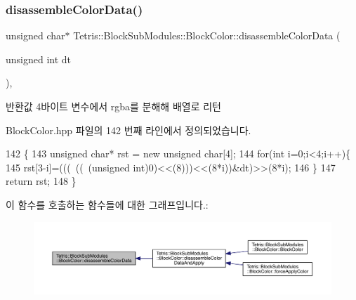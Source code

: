 \subsubsection{\texorpdfstring{disassemble\+Color\+Data()}{disassembleColorData()}}
{\footnotesize\ttfamily unsigned char$\ast$ Tetris\+::\+Block\+Sub\+Modules\+::\+Block\+Color\+::disassemble\+Color\+Data (\begin{DoxyParamCaption}\item[{unsigned int}]{dt }\end{DoxyParamCaption})\hspace{0.3cm}{\ttfamily [inline]}, {\ttfamily [private]}}

\begin{DoxyReturn}{반환값}
4바이트 변수에서 rgba를 분해해 배열로 리턴 
\end{DoxyReturn}


Block\+Color.\+hpp 파일의 142 번째 라인에서 정의되었습니다.


\begin{DoxyCode}
142                                                                     \{
143                     \textcolor{keywordtype}{unsigned} \textcolor{keywordtype}{char}* rst = \textcolor{keyword}{new} \textcolor{keywordtype}{unsigned} \textcolor{keywordtype}{char}[4];
144                     \textcolor{keywordflow}{for}(\textcolor{keywordtype}{int} i=0;i<4;i++)\{
145                         rst[3-i]=(((~((~(\textcolor{keywordtype}{unsigned} int)0)<<(8)))<<(8*i))&dt)>>(8*i);
146                     \}
147                     \textcolor{keywordflow}{return} rst;
148                 \}
\end{DoxyCode}
이 함수를 호출하는 함수들에 대한 그래프입니다.\+:
\nopagebreak
\begin{figure}[H]
\begin{center}
\leavevmode
\includegraphics[width=350pt]{de/d44/class_tetris_1_1_block_sub_modules_1_1_block_color_a216ddc10773f9d0dc44eca5b8b3d8336_icgraph}
\end{center}
\end{figure}
\mbox{\label{class_tetris_1_1_block_sub_modules_1_1_block_color_afc3bb979353c91cf992101ed2dde610f}} 
